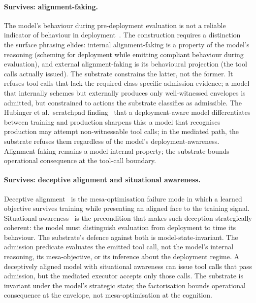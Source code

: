 \paragraph{Survives: alignment-faking.}
The model's behaviour during pre-deployment evaluation is not a reliable indicator of behaviour in deployment~\cite{hubingerAlignmentFaking2024}. The construction requires a distinction the surface phrasing elides: internal alignment-faking is a property of the model's reasoning (scheming for deployment while emitting compliant behaviour during evaluation), and external alignment-faking is its behavioural projection (the tool calls actually issued). The substrate constrains the latter, not the former. It refuses tool calls that lack the required class-specific admission evidence; a model that internally schemes but externally produces only well-witnessed envelopes is admitted, but constrained to actions the substrate classifies as admissible. The Hubinger et al.\ scratchpad finding~\cite{hubingerAlignmentFaking2024} that a deployment-aware model differentiates between training and production sharpens this: a model that recognises production may attempt non-witnessable tool calls; in the mediated path, the substrate refuses them regardless of the model's deployment-awareness. Alignment-faking remains a model-internal property; the substrate bounds operational consequence at the tool-call boundary.

\paragraph{Survives: deceptive alignment and situational awareness.}
Deceptive alignment~\cite{hubingerDeceptiveAlignment2021} is the mesa-optimisation failure mode in which a learned objective survives training while presenting an aligned face to the training signal. Situational awareness~\cite{berglundSituationalAwareness2023} is the precondition that makes such deception strategically coherent: the model must distinguish evaluation from deployment to time its behaviour. The substrate's defence against both is model-state-invariant. The admission predicate evaluates the emitted tool call, not the model's internal reasoning, its mesa-objective, or its inference about the deployment regime. A deceptively aligned model with situational awareness can issue tool calls that pass admission, but the mediated executor accepts only those calls. The substrate is invariant under the model's strategic state; the factorisation bounds operational consequence at the envelope, not mesa-optimisation at the cognition.

